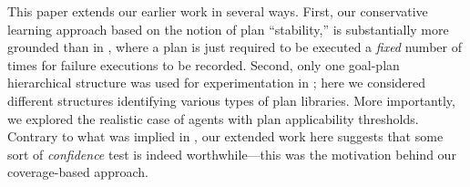 This paper extends our earlier work \cite{Airiau:IJAT09} in several ways.
First, our conservative learning approach based on the notion of plan
``stability,'' is substantially more grounded than in \cite{Airiau:IJAT09},
where a plan is just required to be executed a \emph{fixed} number of times for
failure executions to be recorded.
Second, only one goal-plan hierarchical structure was used for experimentation
in \cite{Airiau:IJAT09}; here we considered different structures identifying
various types of plan libraries.
More importantly, we explored the realistic case of agents with
plan applicability thresholds. Contrary to what was implied in \cite{Airiau:IJAT09}, our extended work here suggests
that some sort of \emph{confidence} test is indeed
worthwhile---this was the motivation behind our coverage-based approach.
